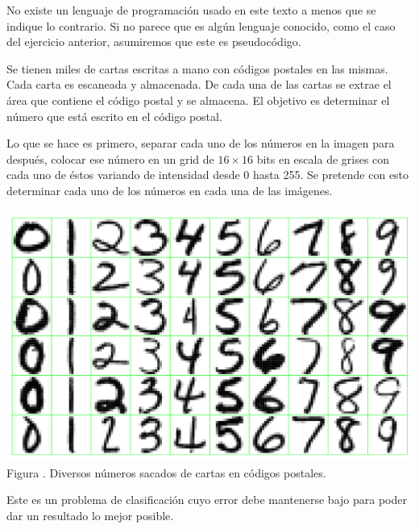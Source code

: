 \documentclass[12pt]{report}
\newcounter{it}
\theoremstyle{largebreak}
\newcounter{figcount}
\begin{document}
    \begin{obs}
        No existe un lenguaje de programación usado en este texto a menos que se indique lo contrario. Si no parece que es algún lenguaje conocido, como el caso del ejercicio anterior, asumiremos que este es pseudocódigo.
    \end{obs}

    \begin{excer}
        Se tienen miles de cartas escritas a mano con códigos postales en las mismas. Cada carta es escaneada y almacenada. De cada una de las cartas se extrae el área que contiene el código postal y se almacena. El objetivo es determinar el número que está escrito en el código postal.
    \end{excer}

    \begin{sol}
        Lo que se hace es primero, separar cada uno de los números en la imagen para después, colocar ese número en un grid de $16\times 16$ bits en escala de grises con cada uno de éstos variando de intensidad desde 0 hasta 255. Se pretende con esto determinar cada uno de los números en cada una de las imágenes.

        \begin{minipage}{\textwidth}
            \begin{center}
                \includegraphics[scale=0.3]{images/image_1.png}\\
                Figura \thefigcount. Diversos números sacados de cartas en códigos postales.
            \end{center}
        \end{minipage}

        Este es un problema de clasificación cuyo error debe mantenerse bajo para poder dar un resultado lo mejor posible.
    \end{sol}
\end{document}
